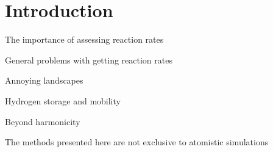 \chapter{Introduction}
\label{chap:introduction}

\bit
\item The importance of assessing reaction rates
\item General problems with getting reaction rates
\item Annoying landscapes
\item Hydrogen storage and mobility
\item Beyond harmonicity
\item The methods presented here are not exclusive to atomistic simulations
\eit

\placeholder


